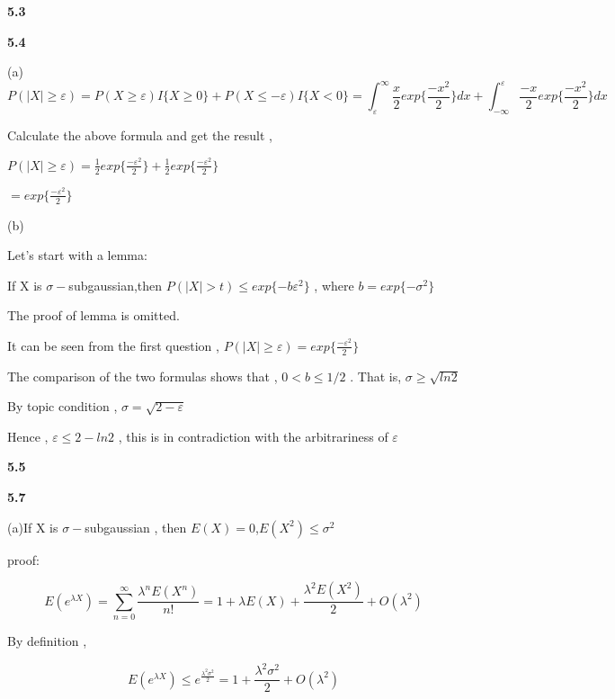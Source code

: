\noindent\textbf{5.3}



\noindent\textbf{5.4}



(a)
\begin{equation}
P(|X|\geq \varepsilon) = P(X\geq\varepsilon)I\{X\geq 0\}+P(X\leq -\varepsilon)I\{X< 0\}
=\int_{\varepsilon}^{\infty} \frac{x}{2} exp\{ \frac{-x^2}{2}\} dx + \int_{-\infty}^{\varepsilon} \frac{-x}{2} exp\{ \frac{-x^2}{2}\} dx
\end{equation}

Calculate the above formula and get the result ,

$P(|X|\geq \varepsilon) =\frac{1}{2} exp\{ \frac{-\varepsilon^2}{2}\} + \frac{1}{2} exp\{ \frac{-\varepsilon^2}{2}\}$

$=exp\{ \frac{-\varepsilon^2}{2}\}$


(b)

Let's start with a lemma:

If X is $\sigma-$subgaussian,then $P(|X|>t) \leq exp\{ -b \varepsilon^2\}$ , where $b=exp\{ -\sigma^2\}$

The proof of lemma is omitted.

It can be seen from the first question , $P(|X|\geq \varepsilon) = exp\{ \frac{-\varepsilon^2}{2}\}$

The comparison of the two formulas shows that , $0<b\leq 1/2$ . That is, $\sigma\geq \sqrt{ln2}$

By topic condition , $\sigma = \sqrt{2-\varepsilon}$

Hence , $\varepsilon \leq 2-ln2$ , this is in contradiction with the arbitrariness of $\varepsilon$


\noindent\textbf{5.5}


\noindent\textbf{5.7}


(a)If X is $\sigma-$subgaussian , then $E(X)=0$,$E(X^2)\leq\sigma^2$

proof:

\begin{equation}
E(e^{\lambda X}) = \sum_{n=0}^{\infty}\frac{\lambda^n E(X^n)}{n!}=1+\lambda E(X)+\frac{\lambda^2 E(X^2)}{2}+O(\lambda^2)
\end{equation}

By definition ,

\begin{equation}
E(e^{\lambda X})\leq e^{\frac{\lambda^2 \sigma^2}{2}}=1+\frac{\lambda^2 \sigma^2}{2}+O(\lambda^2)
\end{equation}

